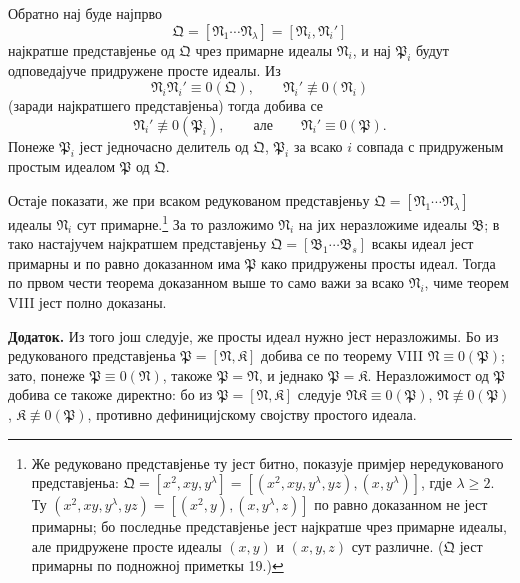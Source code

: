 ﻿\documentclass[11pt]{article}
\newcommand{\ideal}[1]{\mathfrak{#1}}
\begin{document}
Обратно нај буде најпрво
\[
 \ideal Q=[\ideal N_1\cdots\ideal N_\lambda]=[\ideal N_i,\ideal N_i']
\]
најкратше представјенье од \(\ideal Q\) чрез примарне идеалы \(\ideal N_i\), и нај \(\ideal P_i\) будут одповедајуче придружене просте идеалы. Из
\[
 \ideal N_i\ideal N_i'\equiv0(\ideal Q),\qquad
 \ideal N_i'\not\equiv0(\ideal N_i)
\]
(заради најкратшего представјеньа) тогда добива се
\[
 \ideal N_i'\not\equiv0(\ideal P_i),\qquad
 \text{але}\qquad
 \ideal N_i'\equiv0(\ideal P).
\]
Понеже \(\ideal P_i\) јест једночасно делитель од \(\ideal Q\), \(\ideal P_i\) за всако \(i\) совпада с придруженым простым идеалом \(\ideal P\) од \(\ideal Q\).

Остаје показати, же при всаком редукованом представјеньу \(\ideal Q=[\ideal N_1\cdots\ideal N_\lambda]\) идеалы \(\ideal N_i\) сут примарне.\footnote{Же редуковано представјенье ту јест битно, показује примјер нередукованого представјеньа: \(\ideal Q=[x^2,xy,y^\lambda]=[(x^2,xy,y^\lambda,yz),(x,y^\lambda)]\), гдје \(\lambda\ge2\). Ту \((x^2,xy,y^\lambda,yz)=[(x^2,y),(x,y^\lambda,z)]\) по равно доказанном не јест примарны; бо последнье представјенье јест најкратше чрез примарне идеалы, але придружене просте идеалы \((x,y)\) и \((x,y,z)\) сут различне. (\(\ideal Q\) јест примарны по подножној приметкы 19.)} За то разложимо \(\ideal N_i\) на јих неразложиме идеалы \(\ideal B\); в тако настајучем најкратшем представјеньу \(\ideal Q=[\ideal B_1\cdots\ideal B_s]\) всакы идеал јест примарны и по равно доказанном има \(\ideal P\) како придружены просты идеал. Тогда по првом чести теорема доказанном выше то само важи за всако \(\ideal N_i\), чиме теорем VIII јест полно доказаны.

\textbf{Додаток.} Из того још следује, же просты идеал нужно јест неразложимы. Бо из редукованого представјеньа \(\ideal P=[\ideal N,\ideal K]\) добива се по теорему VIII \(\ideal N\equiv0(\ideal P)\); зато, понеже \(\ideal P\equiv0(\ideal N)\), такоже \(\ideal P=\ideal N\), и једнако \(\ideal P=\ideal K\). Неразложимост од \(\ideal P\) добива се такоже директно: бо из \(\ideal P=[\ideal N,\ideal K]\) следује \(\ideal N\ideal K\equiv0(\ideal P)\), \(\ideal N\not\equiv0(\ideal P)\), \(\ideal K\not\equiv0(\ideal P)\), противно дефиницијскому својству простого идеала.
\end{document}
